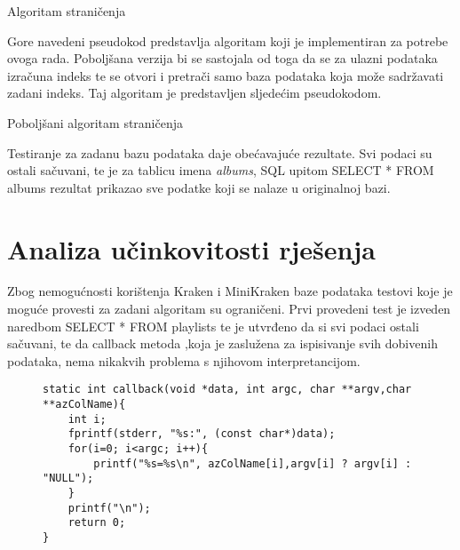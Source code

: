 \documentclass[times, utf8, zavrsni]{fer}
\begin{document}
{	\begin{algorithm}[H]
		\caption{Algoritam straničenja}
		\label{Stranicenje}
	\end{algorithm}

Gore navedeni pseudokod predstavlja algoritam koji je implementiran za potrebe ovoga rada. Poboljšana verzija bi se sastojala od toga da se za ulazni podataka izračuna indeks te se otvori i pretrači samo baza podataka koja može sadržavati zadani indeks. Taj algoritam je predstavljen sljedećim pseudokodom.
\newline
	\begin{algorithm}[H]
		\caption{Poboljšani algoritam straničenja}
		\label{Stranicenje2}
	\end{algorithm}

Testiranje za zadanu bazu podataka daje obećavajuće rezultate. Svi podaci su ostali sačuvani, te je za tablicu imena \textit{albums}, SQL upitom SELECT * FROM albums rezultat prikazao sve podatke koji se nalaze u originalnoj bazi.
\chapter{Analiza učinkovitosti rješenja}
Zbog nemogućnosti korištenja Kraken i MiniKraken baze podataka testovi koje je moguće provesti za zadani algoritam su ograničeni. Prvi provedeni test je izveden naredbom SELECT * FROM playlists te je utvrđeno da si svi podaci ostali sačuvani, te da callback metoda ,koja je zaslužena za ispisivanje svih dobivenih podataka, nema nikakvih problema s njihovom interpretancijom. 
\newline
\begin{figure}[hbp]
	\begin{lstlisting}
static int callback(void *data, int argc, char **argv,char **azColName){
	int i;
	fprintf(stderr, "%s:", (const char*)data);
	for(i=0; i<argc; i++){
		printf("%s=%s\n", azColName[i],argv[i] ? argv[i] : "NULL");
	}
	printf("\n");
	return 0;
}
	\end{lstlisting}
\end{figure}

}
\end{document}

